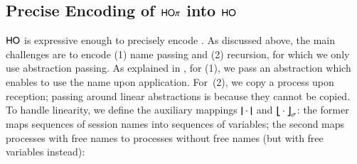 \documentclass[preprint,11pt]{elsarticle}
\begin{document}
{{


\subsection{Precise Encoding of $\mathsf{HO}\pi$ into $\mathsf{HO}$}
\label{subsec:HOpi_to_HO}
$\mathsf{HO}$ is expressive enough to
precisely encode \HOp.
As discussed above, the main challenges are to encode (1) name passing 
and (2) recursion, 
for which 
we only use  abstraction passing. 
 As explained in , for (1), we pass  
an %
abstraction which enables to use the name upon application. 
For~(2), we 
copy a process upon reception; passing around linear abstractions
is  
because 
they cannot be copied.
To handle linearity, we define the  auxiliary 
 mappings 
 $|\!|\cdot|\!|$ and 
$\big\lfloor\!\!\big\lfloor\cdot\big\rfloor\!\!\big\rfloor^{}_\sigma$:
the former maps sequences of session names into sequences of variables; the second 
maps processes with free names to processes without free
names (but with free variables instead):

}}
\end{document}
